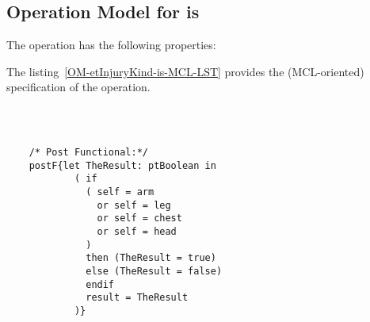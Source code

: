 \subsection{Operation Model for is}

\label{OM-is}


The  operation has the following properties:

	\begin{operationmodel}



		


	\end{operationmodel}



	\vspace{1cm}
	The listing~\ref{OM-etInjuryKind-is-MCL-LST} provides the \msrmessir (MCL-oriented) specification of the operation.
	
	\scriptsize
	\vspace{0.5cm}
	\begin{lstlisting}[style=MessirStyle,firstnumber=auto,captionpos=b,caption={\msrmessir (MCL-oriented) specification of the operation \emph{is}.},label=OM-etInjuryKind-is-MCL-LST]

	
	
	/* Post Functional:*/ 
	postF{let TheResult: ptBoolean in
	        ( if
	          ( self = arm
	            or self = leg
	            or self = chest
	            or self = head
	          )
	          then (TheResult = true)
	          else (TheResult = false)
	          endif
	          result = TheResult
	        )}
	
	
	\end{lstlisting}
	\normalsize 
	
	
	
	





